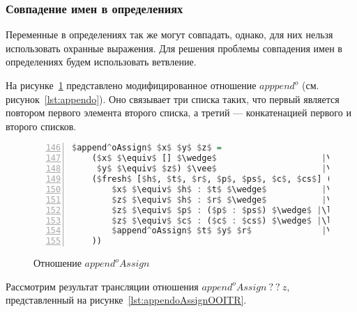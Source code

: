 
\subsubsection{Совпадение имен в определениях}

Переменные в определениях так же могут совпадать, однако, для них нельзя использовать охранные выражения.
Для решения проблемы совпадения имен в определениях будем использовать ветвление.

На рисунке~\ref{lst:appendoAssign} представлено модифицированное отношение $apppend^o$ (см. рисунок~\ref{lst:appendo}).
Оно связывает три списка таких, что первый является повтором первого элемента второго списка, а третий --- конкатенацией первого и второго списков.

\begin{figure}[h!]
  \begin{center}
  \begin{minipage}{0.45\textwidth}
  \begin{lstlisting}[language=Haskell, frame=single, numbers=left,numberstyle=\small, firstnumber=146, escapechar=|]
  $append^oAssign$ $x$ $y$ $z$ =
    ($x$ $\equiv$ [] $\wedge$                     |\label{line:appendoAssign2}|
     $y$ $\equiv$ $z$) $\vee$                     |\label{line:appendoAssign3}|
    ($fresh$ [$h$, $t$, $r$, $p$, $ps$, $c$, $cs$] (
        $x$ $\equiv$ $h$ : $t$ $\wedge$           |\label{line:appendoAssign5}|
        $z$ $\equiv$ $h$ : $r$ $\wedge$           |\label{line:appendoAssign6}|
        $z$ $\equiv$ $p$ : ($p$ : $ps$) $\wedge$ |\label{line:appendoAssign7}|
        $z$ $\equiv$ $c$ : ($c$ : $cs$) $\wedge$ |\label{line:appendoAssign8}|
        $append^oAssign$ $t$ $y$ $r$              |\label{line:appendoAssign9}|
    ))
    \end{lstlisting}
  \end{minipage}
  \end{center}
  \caption{Отношение $append^oAssign$}
  \label{lst:appendoAssign}
\end{figure}

Рассмотрим результат трансляции отношения $append^oAssign \ ? \ ? \ z$, представленный на рисунке~\ref{lst:appendoAssignOOITR}.

